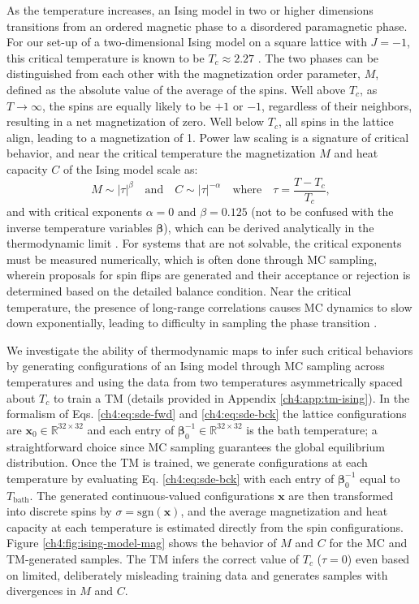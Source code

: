 As the temperature increases, an Ising model in two or higher dimensions transitions from an ordered magnetic phase to a disordered paramagnetic phase. For our set-up of a two-dimensional Ising model on a square lattice with $J=-1$, this critical temperature is known to be $T_c\approx2.27$ \cite{onsager-solution}. The two phases can be distinguished from each other with the magnetization order parameter, $M$, defined as the absolute value of the average of the spins. Well above $T_c$, as $T \rightarrow \infty$, the spins are equally likely to be $+1$ or $-1$, regardless of their neighbors, resulting in a net magnetization of zero. Well below $T_c$, all spins in the lattice align, leading to a magnetization of 1. Power law scaling is a signature of critical behavior, and near the critical temperature the magnetization $M$ and heat capacity $C$ of the Ising model scale as:
\begin{equation}
    M \sim |\tau|^{\beta} \quad \mathrm{and} \quad C \sim |\tau|^{-\alpha} \quad \mathrm{where} \quad \tau = \frac{T-T_c}{T_c},
\end{equation}
and with critical exponents $\alpha=0$ and $\beta=0.125$ (not to be confused with the inverse temperature variables $\bm{\beta}$), which can be derived analytically in the thermodynamic limit \cite{ising-crit-exp}. For systems that are not solvable, the critical exponents must be measured numerically, which is often done through MC sampling, wherein proposals for spin flips are generated and their acceptance or rejection is determined based on the detailed balance condition. Near the critical temperature, the presence of long-range correlations causes MC dynamics to slow down exponentially, leading to difficulty in sampling the phase transition \cite{wolff-critical-slow-down}.

We investigate the ability of thermodynamic maps to infer such critical behaviors by generating configurations of an Ising model through MC sampling across temperatures and using the data from two temperatures asymmetrically spaced about $T_c$ to train a TM (details provided in Appendix \ref{ch4:app:tm-ising}). In the formalism of Eqs. \ref{ch4:eq:sde-fwd} and \ref{ch4:eq:sde-bck} the lattice configurations are $\mathbf{x}_0 \in \mathbb{R}^{32\times32}$ and each entry of $\bm{\beta}_0^{-1} \in \mathbb{R}^{32\times32}$ is the bath temperature; a straightforward choice since MC sampling guarantees the global equilibrium distribution. Once the TM is trained, we generate configurations at each temperature by evaluating Eq. \ref{ch4:eq:sde-bck} with each entry of $\bm{\beta}_0^{-1}$ equal to $T_{\mathrm{bath}}$. The generated continuous-valued configurations $\mathbf{x}$ are then transformed into discrete spins by $\sigma = \mathrm{sgn}(\mathbf{x})$, and the average magnetization and heat capacity at each temperature is estimated directly from the spin configurations. Figure \ref{ch4:fig:ising-model-mag} shows the behavior of $M$ and $C$ for the MC and TM-generated samples. The TM infers the correct value of $T_c$ ($\tau=0$) even based on limited, deliberately misleading training data and generates samples with divergences in $M$ and $C$. 

